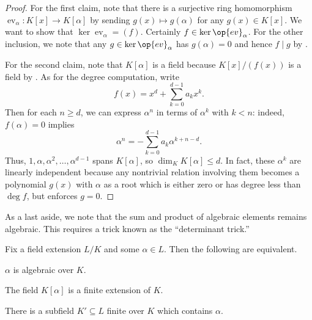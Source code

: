 \documentclass[../notes.tex]{subfiles}
\begin{document}
\begin{proof}
	For the first claim, note that there is a surjective ring homomorphism $\operatorname{ev}_\alpha\colon K[x]\to K[\alpha]$ by sending $g(x)\mapsto g(\alpha)$ for any $g(x)\in K[x]$. We want to show that $\ker{\operatorname{ev}_\alpha}=(f)$. Certainly $f\in\ker\op{ev}_\alpha$. For the other inclusion, we note that any $g\in\ker\op{ev}_\alpha$ has $g(\alpha)=0$ and hence $f\mid g$ by .

	For the second claim, note that $K[\alpha]$ is a field because $K[x]/(f(x))$ is a field by . As for the degree computation, write
	\[f(x)=x^d+\sum_{k=0}^{d-1}a_kx^k.\]
	Then for each $n\ge d$, we can express $\alpha^n$ in terms of $\alpha^k$ with $k<n$: indeed, $f(\alpha)=0$ implies
	\[\alpha^n=-\sum_{k=0}^{d-1}a_k\alpha^{k+n-d}.\]
	Thus, $1,\alpha,\alpha^2,\ldots,\alpha^{d-1}$ spans $K[\alpha]$, so $\dim_KK[\alpha]\le d$. In fact, these $\alpha^k$ are linearly independent because any nontrivial relation involving them becomes a polynomial $g(x)$ with $\alpha$ as a root which is either zero or has degree less than $\deg f$, but  enforces $g=0$.
\end{proof}
As a last aside, we note that the sum and product of algebraic elements remains algebraic. This requires a trick known as the ``determinant trick.''
\begin{proposition} \label{prop:how-to-algebraic}
	Fix a field extension $L/K$ and some $\alpha\in L$. Then the following are equivalent.
	\begin{listalph}
		\item $\alpha$ is algebraic over $K$.
		\item The field $K[\alpha]$ is a finite extension of $K$.
		\item There is a subfield $K'\subseteq L$ finite over $K$ which contains $\alpha$.
	\end{listalph}
\end{proposition}
\end{document}
